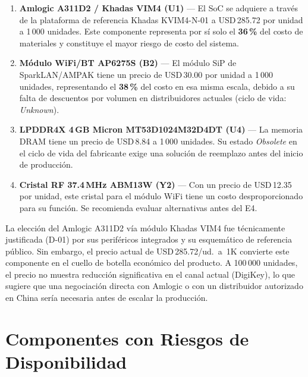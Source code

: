 \begin{enumerate}
  \item \textbf{Amlogic A311D2 / Khadas VIM4 (U1)} --- El SoC se adquiere
    a través de la plataforma de referencia Khadas KVIM4-N-01 a
    USD\,285.72 por unidad a 1\,000 unidades. Este componente representa por
    sí solo el \textbf{36\,\%} del costo de materiales y constituye el mayor
    riesgo de costo del sistema.

  \item \textbf{Módulo WiFi/BT AP6275S (B2)} --- El módulo SiP de
    SparkLAN/AMPAK tiene un precio de USD\,30.00 por unidad a 1\,000
    unidades, representando el \textbf{38\,\%} del costo en esa misma
    escala, debido a su falta de descuentos por volumen en distribuidores
    actuales (ciclo de vida: \emph{Unknown}).

  \item \textbf{LPDDR4X 4\,GB Micron MT53D1024M32D4DT (U4)} ---
    La memoria DRAM tiene un precio de USD\,8.84 a 1\,000 unidades.
    Su estado \emph{Obsolete} en el ciclo de vida del fabricante exige
    una solución de reemplazo antes del inicio de producción.

  \item \textbf{Cristal RF 37.4\,MHz ABM13W (Y2)} --- Con un precio de
    USD\,12.35 por unidad, este cristal para el módulo WiFi tiene
    un costo desproporcionado para su función. Se recomienda evaluar
    alternativas antes del E4.
\end{enumerate}

\begin{decisbox}
  La elección del Amlogic A311D2 vía módulo Khadas VIM4 fue técnicamente
  justificada (D-01) por sus periféricos integrados y su esquemático de
  referencia público. Sin embargo, el precio actual de USD\,285.72/ud.~a~1K
  convierte este componente en el cuello de botella económico del producto.
  A 100\,000 unidades, el precio no muestra reducción significativa en el
  canal actual (DigiKey), lo que sugiere que una negociación directa con
  Amlogic o con un distribuidor autorizado en China sería necesaria antes
  de escalar la producción.
\end{decisbox}

\section{Componentes con Riesgos de Disponibilidad}
\label{sec:bom_riesgos}

